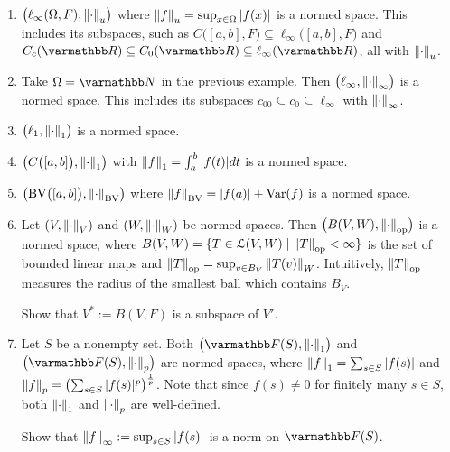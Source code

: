     \begin{example}
        \phantom{a}
        \begin{enumerate}[label = (\arabic*),itemsep=1pt,topsep=3pt]
            \item $\bigl(\ell_\infty(\Omega,F), \left\lVert \cdot \right\rVert_u\bigr)$ where $\left\lVert f \right\rVert_u = \sup_{x \in \Omega}|f(x)|$ is a normed space. This includes its subspaces, such as $C \bigl([a,b],F\bigr) \subseteq \ell_\infty \bigl([a,b],F \bigr)$ and $C_c(\bfR) \subseteq C_0(\bfR) \subseteq \ell_\infty(\bfR)$, all with $\left\lVert \cdot \right\rVert_u$.
            \item Take $\Omega = \bfN$ in the previous example. Then $\bigl(\ell_\infty, \left\lVert \cdot \right\rVert_\infty\bigr)$ is a normed space. This includes its subspaces $c_{00} \subseteq c_0 \subseteq \ell_\infty$ with $\left\lVert \cdot \right\rVert_\infty$.
            \item $\bigl(\ell_1,\left\lVert \cdot \right\rVert_1\bigr)$ is a normed space.
            \item $\bigl(C\bigl([a,b]\bigr), \left\lVert \cdot \right\rVert_1\bigr)$ with $\left\lVert f \right\rVert_1 = \int_a^b |f(t)|dt$ is a normed space.
            \item $\bigl( \text{BV}\bigl([a,b]\bigr), \left\lVert \cdot \right\rVert_{\text{BV}}\bigr)$ where $\left\lVert f \right\rVert_{\text{BV}} = |f(a)| + \text{Var}(f)$ is a normed space.
            \item Let $(V,\left\lVert \cdot \right\rVert_V)$ and $(W,\left\lVert \cdot \right\rVert_W)$ be normed spaces. Then $\bigl(B(V,W),\left\lVert \cdot \right\rVert_\text{op}\bigr)$ is a normed space, where $B(V,W) = \{T \in \mathcal{L}(V,W) \mid \left\lVert T \right\rVert_\text{op} < \infty\}$ is the set of bounded linear maps and $\left\lVert T \right\rVert_\text{op} = \sup_{v \in B_V}\left\lVert T(v) \right\rVert_W$. Intuitively, $\left\lVert T \right\rVert_\text{op}$ measures the radius of the smallest ball which contains $B_V$.
                \begin{exercise}
                    Show that $V^\ast := B(V,F)$ is a subspace of $V'$.
                \end{exercise}
            \item Let $S$ be a nonempty set. Both $\bigl( \bfF(S),\lnorm \cdot \rnorm_1\bigr)$ and $\bigl( \bfF(S),\lnorm \cdot \rnorm_p\bigr)$ are normed spaces, where $\left\lVert f \right\rVert_1 = \sum_{s \in S}|f(s)|$ and $\left\lVert f \right\rVert_p = \left( \sum_{s \in S}|f(s)|^p \right)^\frac{1}{p}$. Note that since $f(s) \neq 0$ for finitely many $s \in S$, both $\left\lVert \cdot \right\rVert_1$ and $\left\lVert \cdot \right\rVert_p$ are well-defined.
                \begin{exercise}
                    Show that $\left\lVert f \right\rVert_\infty := \sup_{s \in S}|f(s)|$ is a norm on $\bfF(S)$.
                \end{exercise}
        \end{enumerate}
    \end{example}
